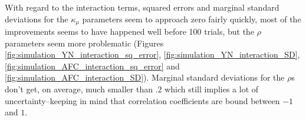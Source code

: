 \documentclass{article}\usepackage{knitr}
\begin{document}
With regard to the interaction terms, squared errors and marginal standard deviations for the $\kappa_{\mu}$ parameters seem to approach zero fairly quickly, most of the improvements seems to have happened well before 100 trials, but the $\rho$ parameters seem more problematic (Figures \ref{fig:simulation_YN_interaction_sq_error}, \ref{fig:simulation_YN_interaction_SD}, \ref{fig:simulation_AFC_interaction_sq_error} and \ref{fig:simulation_AFC_interaction_SD}). Marginal standard deviations for the $\rho$s don't get, on average, much smaller than $.2$ which still implies a lot of uncertainty--keeping in mind that correlation coefficients are bound between $-1$ and $1$.

\clearpage


\end{document}
